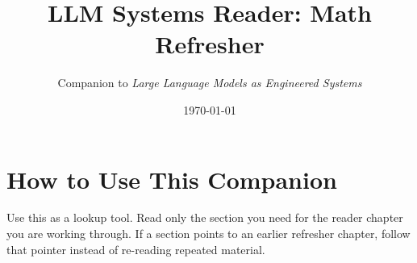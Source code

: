 \documentclass[11pt]{article}
\title{LLM Systems Reader: Math Refresher}
\author{Companion to \emph{Large Language Models as Engineered Systems}}
\date{\today}
\begin{document}
\maketitle
\tableofcontents
\newpage


\clearpage

\clearpage

\clearpage

\clearpage

\clearpage

\clearpage

\clearpage

\clearpage

\clearpage

\clearpage

\clearpage

\clearpage


\section*{How to Use This Companion}
Use this as a lookup tool. Read only the section you need for the reader chapter you are working through. If a section points to an earlier refresher chapter, follow that pointer instead of re-reading repeated material.
\end{document}
